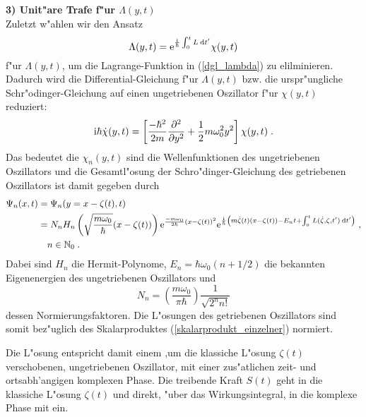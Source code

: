     \textbf{3) Unit"are Trafe f"ur $\Lambda(y,t)$}\\
    Zuletzt w"ahlen wir den Ansatz
    \begin{equation}
      \Lambda(y,t) = \text e^{\frac{\text i}{\hbar}\int_0^tL \: \text d t'}\chi(y,t)
    \end{equation}
    f"ur $\Lambda(y,t)$, um die Lagrange-Funktion in (\ref{dgl_lambda}) zu elilminieren.
    Dadurch wird die Differential-Gleichung f"ur $\Lambda(y,t)$ bzw. die urspr"ungliche Schr"odinger-Gleichung auf einen ungetriebenen Oszillator f"ur $\chi(y,t)$ reduziert:
    \begin{equation}
      \text i \hbar \dot \chi(y,t) = \left[ \frac{-\hbar^2}{2m}\frac{\partial^2}{\partial y^2} + \frac{1}{2}m\omega_0^2y^2 \right]\chi(y,t) \; .
    \end{equation}
    Das bedeutet die $\chi_n(y,t)$ sind die Wellenfunktionen des ungetriebenen Oszillators und die Gesamtl"osung der Schro"dinger-Gleichung des getriebenen Oszillators ist damit gegeben durch
    \begin{align}
      \begin{split}
      \Psi_n(x,t) &= \Psi_n(y=x-\zeta(t),t) \\
      &= N_nH_n\left(\sqrt{\frac{m\omega_0}{\hbar}}(x-\zeta(t))\right) \text e^{\frac{-m\omega_0}{2\hbar}(x-\zeta(t))^2} \text e^{\frac{\text i}{\hbar}\left(m\dot \zeta(t)(x-\zeta(t))-E_nt+\int_0^tL(\dot \zeta,\zeta,t')\:\text dt'\right)} \; , \\
      &\quad n \in \mathbb{N}_0 \; .
    \end{split}
    \end{align}
    Dabei sind $H_n$ die Hermit-Polynome, $E_n = \hbar \omega_0(n+1/2)$ die bekannten Eigenenergien des ungetriebenen Oszillators und
    \begin{equation}
      N_n = \left(\frac{m\omega_0}{\pi \hbar}\right) \frac{1}{\sqrt{2^nn!}}
    \end{equation}
    dessen Normierungsfaktoren.
    Die L"osungen des getriebenen Oszillators sind somit bez"uglich des Skalarproduktes (\ref{skalarprodukt_einzelner}) normiert.

    Die L"osung entspricht damit einem ,um die klassiche L"osung $\zeta(t)$ verschobenen, ungetriebenen Oszillator, mit einer zus"atlichen zeit- und ortsabh'angigen komplexen Phase.
    Die treibende Kraft $S(t)$ geht in die klassiche L"osung $\zeta(t)$ und direkt, "uber das Wirkungsintegral, in die komplexe Phase mit ein.


